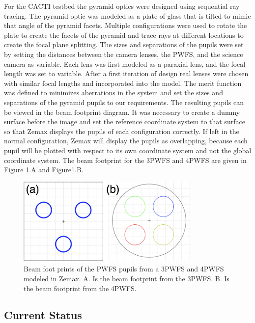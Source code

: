 For the CACTI testbed the pyramid optics were designed using sequential ray tracing. The pyramid optic was modeled as a plate of glass that is tilted to mimic that angle of the pyramid facets. Multiple configurations were used to rotate the plate to create the facets of the pyramid and trace rays at different locations to create the focal plane splitting. The sizes and separations of the pupils were set by setting the distances between the camera lenses, the PWFS, and the science camera as variable. Each lens was first modeled as a paraxial lens, and the focal length was set to variable. After a first iteration of design real lenses were chosen with similar focal lengths and incorporated into the model. The merit function was defined to minimizes aberrations in the system and set the sizes and separations of the pyramid pupils to our requirements. The resulting pupils can be viewed in the beam footprint diagram. It was necessary to create a dummy surface before the image and set the reference coordinate system to that surface so that Zemax displays the pupils of each configuration correctly. If left in the normal configuration, Zemax will display the pupils as overlapping, because each pupil will be plotted with respect to its own coordinate system and not the global coordinate system. The beam footprint for the 3PWFS and 4PWFS are given in Figure \ref{fig:beamfp}.A and Figure\ref{fig:beamfp}.B. 

\begin{figure}
    \centering
    \includegraphics[width=0.8\textwidth]{Chapter Materials/Chapter Five Materials/BeamFootPrint.png}
    \caption{Beam foot prints of the PWFS pupils from a 3PWFS and 4PWFS modeled in Zemax. A. Is the beam footprint from the 3PWFS. B. Is the beam footprint from the 4PWFS.  }
    \label{fig:beamfp}
\end{figure}


\subsection{Current Status}

